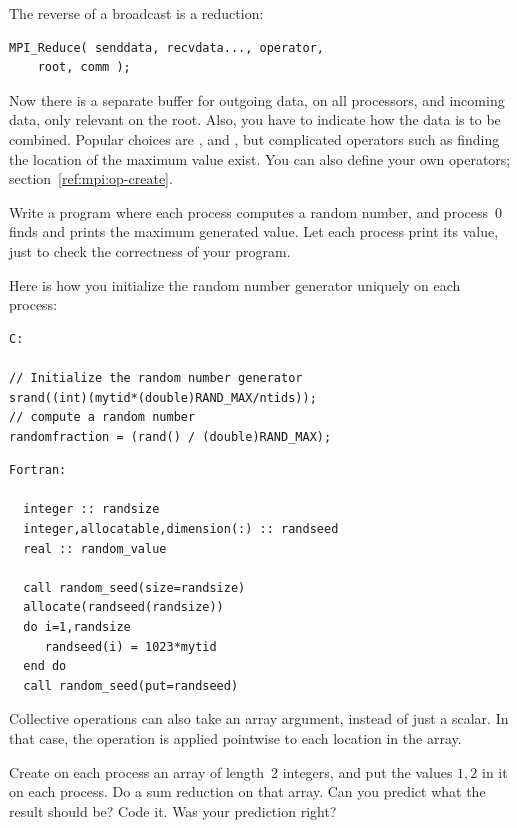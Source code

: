 The reverse of a broadcast is a reduction:
\begin{verbatim}
MPI_Reduce( senddata, recvdata..., operator,
    root, comm ); 
\end{verbatim}
Now there is a separate buffer for outgoing data, on all processors,
and incoming data, only relevant on the root. Also, you have to
indicate how the data is to be combined. Popular choices are
,  and
, but complicated operators such as finding the
location of the maximum value exist. You can also define your own
operators; section~\ref{ref:mpi:op-create}.

\begin{exercise}
  \label{ex:randommax}
  Write a program where each process computes a random number, and process~0
  finds and prints the maximum generated value. Let each process print its value,
  just to check the correctness of your program.

\end{exercise}

  Here is how you initialize the random number generator uniquely on each process:

{\footnotesize
\begin{verbatim}
C:

// Initialize the random number generator
srand((int)(mytid*(double)RAND_MAX/ntids));
// compute a random number
randomfraction = (rand() / (double)RAND_MAX);
\end{verbatim}
\begin{verbatim}
Fortran:

  integer :: randsize
  integer,allocatable,dimension(:) :: randseed
  real :: random_value

  call random_seed(size=randsize)
  allocate(randseed(randsize))
  do i=1,randsize
     randseed(i) = 1023*mytid
  end do
  call random_seed(put=randseed)
\end{verbatim}
}

Collective operations can also take an array argument, instead of just a scalar.
In that case, the operation is applied pointwise to each location in the array.

\begin{exercise}
  \label{ex:randomcoord}
  Create on each process an array of length~2 integers, and put the values $1,2$
  in it on each process. Do a sum reduction on that array. Can you predict what the result should be?
  Code it. Was your prediction right?
\end{exercise}

